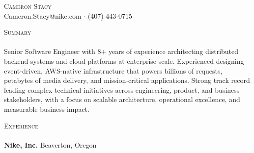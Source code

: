 \documentclass[a4paper]{article}
\newcommand{\lineunder} {
    \vspace*{-8pt} \\
    \hspace*{-18pt} \hrulefill \\
}
\newcommand{\header} [1] {
    {\hspace*{-18pt}\vspace*{6pt} \textsc{#1}}
    \vspace*{-6pt} \lineunder
}
\begin{document}
\vspace*{-30pt}

\begin{center}
	{\Huge \scshape {Cameron Stacy}}\\
	Cameron.Stacy@nike.com $\cdot$ (407) 443-0715\\
\end{center}

\header{Summary}
Senior Software Engineer with 8+ years of experience architecting distributed backend systems and cloud platforms at enterprise scale. Experienced designing event-driven, AWS-native infrastructure that powers billions of requests, petabytes of media delivery, and mission-critical applications. Strong track record leading complex technical initiatives across engineering, product, and business stakeholders, with a focus on scalable architecture, operational excellence, and measurable business impact.
\vspace{3mm}

\header{Experience}

\textbf {Nike, Inc.} \hfill Beaverton, Oregon\\
\end{document}
